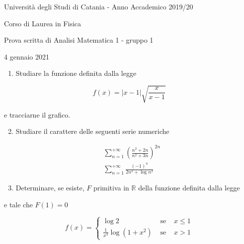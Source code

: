 \documentclass[10pt]{article}
\begin{document}
Università degli Studi di Catania - Anno Accademico 2019/20

Corso di Laurea in Fisica

Prova scritta di Analisi Matematica 1 - gruppo 1

4 gennaio 2021

\begin{enumerate}
  \item Studiare la funzione definita dalla legge
\end{enumerate}

\[
f(x)=|x-1| \sqrt{\frac{x}{x-1}}
\]

e tracciarne il grafico.

\begin{enumerate}
  \setcounter{enumi}{1}
  \item Studiare il carattere delle seguenti serie numeriche
\end{enumerate}

\[
\begin{aligned}
& \sum_{n=1}^{+\infty}\left(\frac{n^{2}+2 n}{n^{2}+3 n}\right)^{2 n} \\
& \sum_{n=1}^{+\infty} \frac{(-1)^{n}}{2 n^{3}+\log n^{2}}
\end{aligned}
\]

\begin{enumerate}
  \setcounter{enumi}{2}
  \item Determinare, se esiste, \(F\) primitiva in \(\mathbb{R}\) della funzione definita dalla legge
\end{enumerate}

e tale che \(F(1)=0\)

\[
f(x)=\left\{\begin{array}{lll}
\log 2 & \text { se } & x \leq 1 \\
\frac{1}{x^{3}} \log \left(1+x^{2}\right) & \text { se } & x>1
\end{array}\right.
\]
\end{document}
